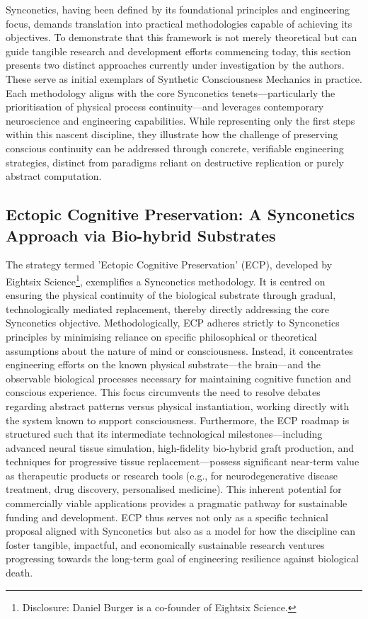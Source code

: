 \documentclass[10pt]{article}
\begin{document}
\begin{sloppypar}
  Synconetics, having been defined by its foundational principles and engineering focus, demands translation into practical methodologies capable of achieving its objectives. To demonstrate that this framework is not merely theoretical but can guide tangible research and development efforts commencing today, this section presents two distinct approaches currently under investigation by the authors. These serve as initial exemplars of Synthetic Consciousness Mechanics in practice. Each methodology aligns with the core Synconetics tenets—particularly the prioritisation of physical process continuity—and leverages contemporary neuroscience and engineering capabilities. While representing only the first steps within this nascent discipline, they illustrate how the challenge of preserving conscious continuity can be addressed through concrete, verifiable engineering strategies, distinct from paradigms reliant on destructive replication or purely abstract computation.

  \subsection{Ectopic Cognitive Preservation: A Synconetics Approach via Bio-hybrid Substrates}
  \label{sec:daniel-approach}

  The strategy termed 'Ectopic Cognitive Preservation' (ECP), developed by Eightsix Science\footnote{Disclosure: Daniel Burger is a co-founder of Eightsix Science.}, exemplifies a Synconetics methodology. It is centred on ensuring the physical continuity of the biological substrate through gradual, technologically mediated replacement, thereby directly addressing the core Synconetics objective. Methodologically, ECP adheres strictly to Synconetics principles by minimising reliance on specific philosophical or theoretical assumptions about the nature of mind or consciousness. Instead, it concentrates engineering efforts on the known physical substrate—the brain—and the observable biological processes necessary for maintaining cognitive function and conscious experience. This focus circumvents the need to resolve debates regarding abstract patterns versus physical instantiation, working directly with the system known to support consciousness. Furthermore, the ECP roadmap is structured such that its intermediate technological milestones—including advanced neural tissue simulation, high-fidelity bio-hybrid graft production, and techniques for progressive tissue replacement—possess significant near-term value as therapeutic products or research tools (e.g., for neurodegenerative disease treatment, drug discovery, personalised medicine). This inherent potential for commercially viable applications provides a pragmatic pathway for sustainable funding and development. ECP thus serves not only as a specific technical proposal aligned with Synconetics but also as a model for how the discipline can foster tangible, impactful, and economically sustainable research ventures progressing towards the long-term goal of engineering resilience against biological death.


\end{sloppypar}
\end{document}
